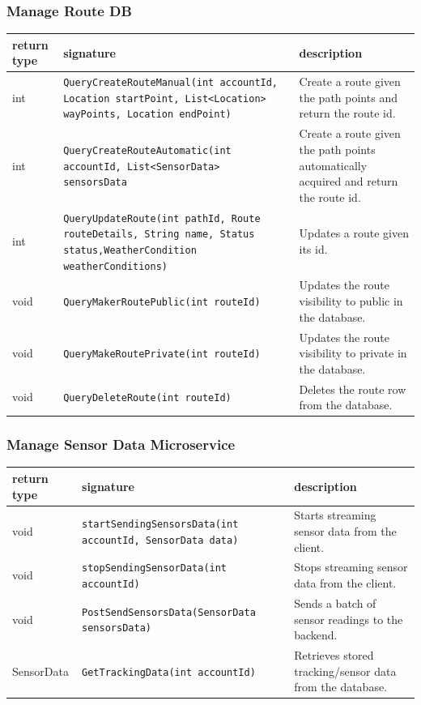 \subsubsection{Manage Route DB}
\begin{table}[H]
\centering
\small
\begin{tabularx}{\textwidth}{|L{3cm}|L{6.5cm}|Y|}
\hline
\textbf{return type} & \textbf{signature} & \textbf{description} \\
\hline
int & \texttt{QueryCreateRouteManual(int accountId, Location startPoint, List<Location> wayPoints, Location endPoint)} & Create a route given the path points and return the route id. \\
\hline
int & \texttt{QueryCreateRouteAutomatic(int accountId, List<SensorData> sensorsData} & Create a route given the path points automatically acquired and return the route id. \\
\hline
int & \texttt{QueryUpdateRoute(int pathId, Route routeDetails, String name, Status status,WeatherCondition weatherConditions)} & Updates a route given its id. \\
\hline
void & \texttt{QueryMakerRoutePublic(int routeId)} & Updates the route visibility to public in the database. \\
\hline
void & \texttt{QueryMakeRoutePrivate(int routeId)} & Updates the route visibility to private in the database. \\
\hline
void & \texttt{QueryDeleteRoute(int routeId)} & Deletes the route row from the database. \\ \hline
\end{tabularx}
\end{table}
\subsubsection{Manage Sensor Data Microservice}
\begin{table}[H]
\centering
\small
\begin{tabularx}{\textwidth}{|L{3cm}|L{6.5cm}|Y|}
\hline
\textbf{return type} & \textbf{signature} & \textbf{description} \\
\hline
void & \texttt{startSendingSensorsData(int accountId, SensorData data)} & Starts streaming sensor data from the client. \\
\hline
void & \texttt{stopSendingSensorData(int accountId)} & Stops streaming sensor data from the client. \\
\hline
void & \texttt{PostSendSensorsData(SensorData sensorsData)} & Sends a batch of sensor readings to the backend. \\
\hline
SensorData & \texttt{GetTrackingData(int accountId)} & Retrieves stored tracking/sensor data from the database. \\
\hline
\end{tabularx}
\end{table}
